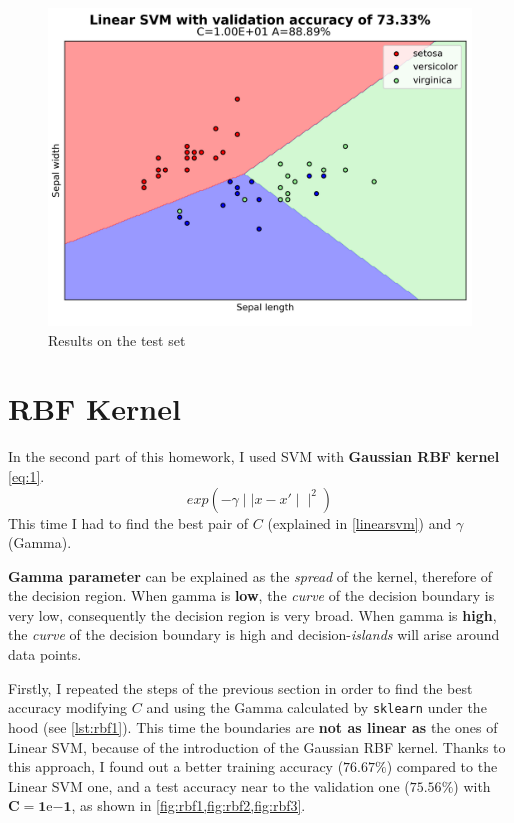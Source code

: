 \documentclass[a4paper, 11pt]{article}
\begin{document}
	\begin{figure}[ht!]
		\centering
		\includegraphics[width=0.7\paperwidth]{img/fig01c.png}
		\caption{Results on the test set}
		\label{fig:linear3}
	\end{figure}
		
	\section{RBF Kernel}
	
	In the second part of this homework, I used SVM with \textbf{Gaussian RBF kernel} \vref{eq:1}.
	\begin{equation} \label{eq:1}
	exp(-\gamma \mid\mid x-x' \mid\mid^2)
	\end{equation}
	This time I had to find the best pair of $C$ (explained in \vref{linearsvm})  and $\gamma$ (Gamma).
	
	\textbf{Gamma parameter} can be explained as the \textit{spread} of the kernel, therefore of the decision region. When gamma is \textbf{low}, the \textit{curve} of the decision boundary is very low, consequently the decision region is very broad. When gamma is \textbf{high}, the \textit{curve} of the decision boundary is high and decision-\textit{islands} will arise around data points.
	
	Firstly, I repeated the steps of the previous section in order to find the best accuracy modifying $C$ and using the Gamma calculated by \texttt{sklearn} under the hood (see \vref{lst:rbf1}).  This time the boundaries are \textbf{not as linear as} the ones of Linear SVM, because of the introduction of the Gaussian RBF kernel. Thanks to this approach, I found out a better training accuracy ($\boldsymbol{76.67\%}$) compared to the Linear SVM one, and a test accuracy near to the validation one ($\boldsymbol{75.56\%}$) with $\boldsymbol{C=1\mathrm{e}{-1}}$, as shown in \vref{fig:rbf1,fig:rbf2,fig:rbf3}.
	
\end{document}
